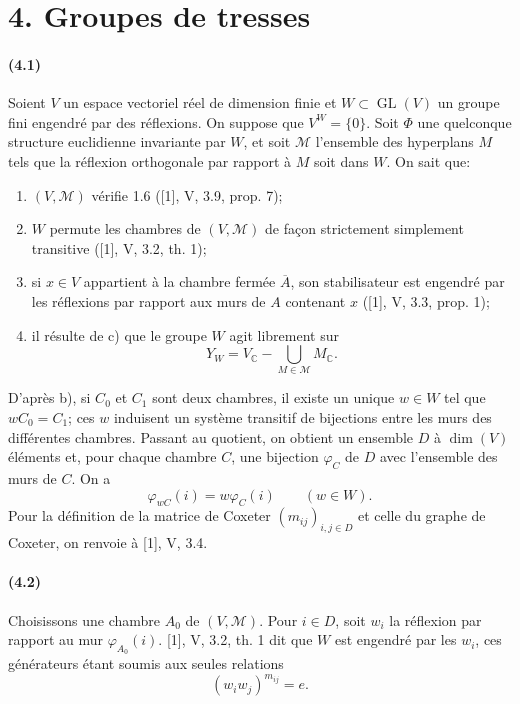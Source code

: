 \documentclass[10pt]{article}
\newcommand{\C}{\mathbb C}
\newcommand{\GL}{\operatorname{GL}}
\begin{document}
\section*{4. Groupes de tresses}

\paragraph{(4.1)} Soient \(V\) un espace vectoriel réel de dimension finie et \(W\subset\GL(V)\) un groupe fini engendré par des réflexions. On suppose que \(V^W=\{0\}\). Soit \(\Phi\) une quelconque structure euclidienne invariante par \(W\), et soit \(\mathcal M\) l'ensemble des hyperplans \(M\) tels que la réflexion orthogonale par rapport à \(M\) soit dans \(W\). On sait que:
\begin{enumerate}[label=\alph*)]
\item \((V,\mathcal M)\) vérifie 1.6 ([1], V, 3.9, prop. 7);
\item \(W\) permute les chambres de \((V,\mathcal M)\) de façon strictement simplement transitive ([1], V, 3.2, th. 1);
\item si \(x\in V\) appartient à la chambre fermée \(\overline A\), son stabilisateur est engendré par les réflexions par rapport aux murs de \(A\) contenant \(x\) ([1], V, 3.3, prop. 1);
\item il résulte de c) que le groupe \(W\) agit librement sur
\[
Y_W=V_\C-\bigcup_{M\in\mathcal M}M_\C.
\]
\end{enumerate}
D'après b), si \(C_0\) et \(C_1\) sont deux chambres, il existe un unique \(w\in W\) tel que \(wC_0=C_1\); ces \(w\) induisent un système transitif de bijections entre les murs des différentes chambres. Passant au quotient, on obtient un ensemble \(D\) à \(\dim(V)\) éléments et, pour chaque chambre \(C\), une bijection \(\varphi_C\) de \(D\) avec l'ensemble des murs de \(C\). On a
\[
\tag{4.1.1}
\varphi_{wC}(i)=w\varphi_C(i)\qquad(w\in W).
\]
Pour la définition de la matrice de Coxeter \((m_{ij})_{i,j\in D}\) et celle du graphe de Coxeter, on renvoie à [1], V, 3.4.

\paragraph{(4.2)} Choisissons une chambre \(A_0\) de \((V,\mathcal M)\). Pour \(i\in D\), soit \(w_i\) la réflexion par rapport au mur \(\varphi_{A_0}(i)\). [1], V, 3.2, th. 1 dit que \(W\) est engendré par les \(w_i\), ces générateurs étant soumis aux seules relations
\[
(w_iw_j)^{m_{ij}}=e.
\]
\end{document}
